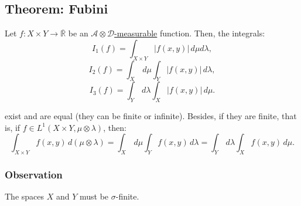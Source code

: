 \documentclass[11pt]{article}
\begin{document}
\subsection{Theorem: Fubini}
Let \(f: X \times Y \to \overline{\mathbb{R}}\) be an \underline{\(\mathcal{A} \otimes \mathcal{D}\)-measurable} function. Then, the integrals:
\[I_1 (f) = \int_{X \times Y} \left|f(x, y)\right| \,d\mu d\lambda,\]
\[I_2 (f) = \int_X \,d\mu \int_Y \left|f(x, y)\right| \,d\lambda,\]
\[I_3 (f) = \int_Y \,d\lambda \int_X \left|f(x, y)\right| \,d\mu.\]

exist and are equal (they can be finite or infinite). Besides, if they are finite, that is, if \(f \in L^1(X \times Y, \mu \otimes \lambda)\), then:
\[\int_{X \times Y} f(x, y) \,d(\mu \otimes \lambda) = \int_X \,d\mu \int_Y f(x, y) \,d\lambda = \int_Y \,d\lambda \int_X f(x, y) \,d\mu.\]

\subsubsection*{Observation}
The spaces \(X\) and \(Y\) must be \(\sigma\)-finite.
\end{document}
